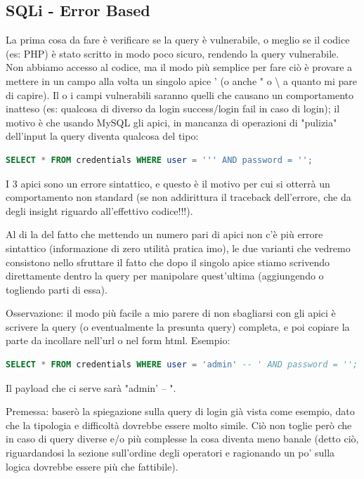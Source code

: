 \documentclass[12pt,a4paper]{report}
\begin{document}
	\subsection{SQLi - Error Based}
	La prima cosa da fare è verificare se la query è vulnerabile, o meglio se il codice (es: PHP) è stato scritto in modo poco sicuro, rendendo la query vulnerabile. Non abbiamo accesso al codice, ma il modo più semplice per fare ciò è provare a mettere in un campo alla volta un singolo apice ' (o anche " o \textbackslash{} a quanto mi pare di capire). Il o i campi vulnerabili saranno quelli che causano un comportamento inatteso (es: qualcosa di diverso da login success/login fail in caso di login); il motivo è che usando MySQL gli apici, in mancanza di operazioni di "pulizia" dell'input la query diventa qualcosa del tipo: 
	\begin{lstlisting}[language=SQL]
		SELECT * FROM credentials WHERE user = ''' AND password = '';
	\end{lstlisting}
	I 3 apici sono un errore sintattico, e questo è il motivo per cui si otterrà un comportamento non standard (se non addirittura il traceback dell'errore, che da degli insight riguardo all'effettivo codice!!!).
	
	Al di la del fatto che mettendo un numero pari di apici non c'è più errore sintattico (informazione di zero utilità pratica imo), le due varianti che vedremo consistono nello sfruttare il fatto che dopo il singolo apice stiamo scrivendo direttamente dentro la query per manipolare quest'ultima (aggiungendo o togliendo parti di essa).
	
	Osservazione: il modo più facile a mio parere di non sbagliarsi con gli apici è scrivere la query (o eventualmente la presunta query) completa, e poi copiare la parte da incollare nell'url o nel form html. Esempio:
	\begin{lstlisting}[language=SQL]
		SELECT * FROM credentials WHERE user = 'admin' -- ' AND password = '';
	\end{lstlisting}
	Il payload che ci serve sarà "admin' -- ".
	
	Premessa: baserò la spiegazione sulla query di login già vista come esempio, dato che la tipologia e difficoltà dovrebbe essere molto simile. Ciò non toglie però che in caso di query diverse e/o più complesse la cosa diventa meno banale (detto ciò, riguardandosi la sezione sull'ordine degli operatori e ragionando un po' sulla logica dovrebbe essere più che fattibile).
	
\end{document}
